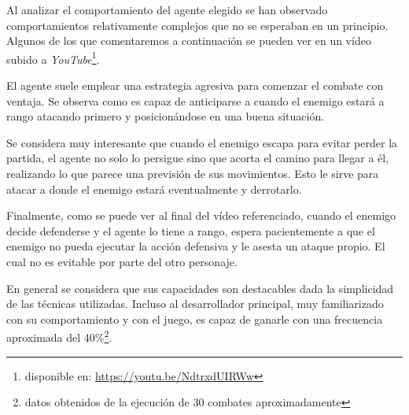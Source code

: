 Al analizar el comportamiento del agente elegido se han observado comportamientos relativamente complejos que no se esperaban en un principio. Algunos de los que comentaremos a continuación se pueden ver en un vídeo subido a \textit{YouTube}\footnote{disponible en: \url{https://youtu.be/NdtrxdUIRWw}}.

\bigskip

El agente suele emplear una estrategia agresiva para comenzar el combate con ventaja. Se observa como es capaz de anticiparse a cuando el enemigo estará a rango atacando primero y posicionándose en una buena situación.

\bigskip

Se considera muy interesante que cuando el enemigo escapa para evitar perder la partida, el agente no solo lo persigue sino que acorta el camino para llegar a él, realizando lo que parece una previsión de sus movimientos. Esto le sirve para atacar a donde el enemigo estará eventualmente y derrotarlo.

\bigskip

Finalmente, como se puede ver al final del vídeo referenciado, cuando el enemigo decide defenderse y el agente lo tiene a rango, espera pacientemente a que el enemigo no pueda ejecutar la acción defensiva y le asesta un ataque propio. El cual no es evitable por parte del otro personaje.

\bigskip

En general se considera que sus capacidades son destacables dada la simplicidad de las técnicas utilizadas. Incluso al desarrollador principal, muy familiarizado con su comportamiento y con el juego, es capaz de ganarle con una frecuencia aproximada del 40\%\footnote{datos obtenidos de la ejecución de 30 combates aproximadamente}.



